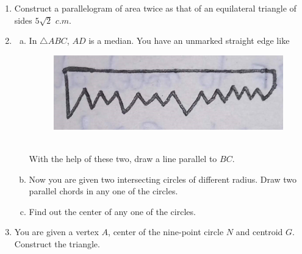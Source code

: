 \documentclass[11pt, a4paper]{article}
\begin{document}
\begin{enumerate}
	\item Construct a parallelogram of area twice as that of an equilateral triangle of sides $5\sqrt{2}$ $c.m.$
	
	\item \begin{enumerate}[(a)]
		\item In $\bigtriangleup ABC$, $AD$ is a median. You have an unmarked straight edge like
		\begin{figure}[h]
		\centering
		\includegraphics[scale=0.15]{IMG_20231102_145518_873}
		\end{figure}
	\\ With the help of these two, draw a line parallel to $BC$.
		\item Now you are given two intersecting circles of different radius. Draw two parallel chords in any one of the circles.
		\item Find out the center of any one of the circles.
	\end{enumerate}

	\item You are given a vertex $A$, center of the nine-point circle $N$ and centroid $G$. Construct the triangle.
\end{enumerate}
\end{document}
